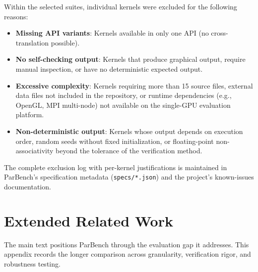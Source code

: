 Within the selected suites, individual kernels were excluded for the following
reasons:
\begin{itemize}
  \item \textbf{Missing API variants}: Kernels available in only one API (no
    cross-translation possible).
  \item \textbf{No self-checking output}: Kernels that produce graphical output,
    require manual inspection, or have no deterministic expected output.
  \item \textbf{Excessive complexity}: Kernels requiring more than 15 source
    files, external data files not included in the repository, or runtime
    dependencies (e.g., OpenGL, MPI multi-node) not available on the single-GPU
    evaluation platform.
  \item \textbf{Non-deterministic output}: Kernels whose output depends on
    execution order, random seeds without fixed initialization, or
    floating-point non-associativity beyond the tolerance of the verification
    method.
\end{itemize}

The complete exclusion log with per-kernel justifications is maintained in
ParBench's specification metadata (\texttt{specs/*.json}) and the project's
known-issues documentation.


\section{Extended Related Work}
\label{sec:appendix-related}

The main text positions ParBench through the evaluation gap it addresses. This
appendix records the longer comparison across granularity, verification rigor,
and robustness testing.

